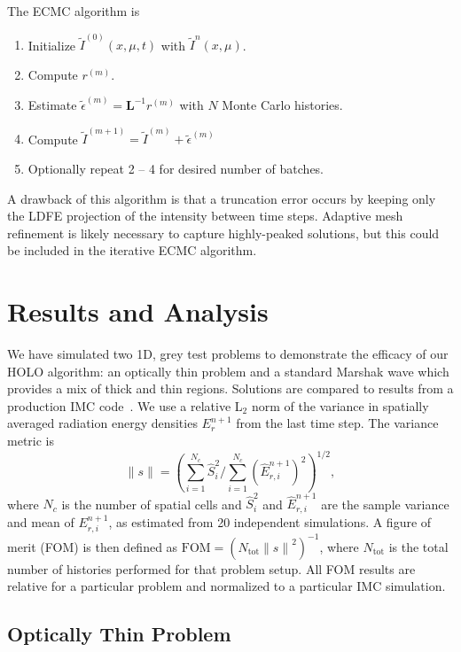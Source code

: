\documentclass{anstrans}
\newcommand{\B}[1]{\ensuremath{\mathbf{#1}}}
\newcommand{\FOM}{\ensuremath{\text{FOM}}}
\renewcommand{\ss}{\ensuremath{\|s\|}}
\begin{document}
  The ECMC algorithm is
\begin{enumerate}
    \item Initialize $\tilde I^{(0)}(x,\mu,t)$ with $\tilde I^{n}(x,\mu)$.
\item Compute $r^{(m)}$.
\item Estimate $\tilde{\epsilon}^{(m)} = \B L^{-1} r^{(m)}$ with $N$ Monte Carlo histories.
\item Compute $\tilde I^{(m+1)} = \tilde I^{(m)}
+ \tilde\epsilon^{(m)}$
\item Optionally repeat 2 -- 4 for desired number of batches.
\end{enumerate}
A drawback of this algorithm is that
a truncation error occurs by keeping only the LDFE projection of the intensity between
time steps.  Adaptive mesh refinement is likely necessary to capture highly-peaked solutions, but
this could be included in the iterative ECMC algorithm.


\section*{Results and Analysis}

We have simulated two 1D, grey test problems to demonstrate the efficacy of our HOLO
algorithm: an optically thin problem and a standard Marshak wave which provides a mix of thick and
thin regions.  Solutions are compared to results from a production IMC code~\cite{jayenne}.
We use a relative L$_2$ norm of the variance in spatially averaged radiation energy
densities $E_r^{n+1}$ from the last time step. The variance metric is
\begin{equation}
    \ss = \left({{\sum\limits_{i=1}^{N_c}
\hat S_i^2}\bigg/{\sum\limits_{i=1}^{N_c} \left(\hat{E}_{r,i}^{n+1}\right)^2}}\right)^{1/2},
\end{equation}
where $N_c$ is the number of spatial cells and $\hat S_i^2$ and $\hat E_{r,i}^{n+1}$ are the
sample variance and mean of $E_{r,i}^{n+1}$, as estimated from 20 independent simulations.  A figure of merit (FOM) is
then defined as $\FOM = \left({N_{\text{tot}}\ss^2}\right)^{-1}$,
where $N_{\text{tot}}$ is the total number of histories performed for that problem setup. All FOM results
are relative for a particular problem and normalized to a particular IMC simulation.

\subsection{Optically Thin Problem}
\end{document}
